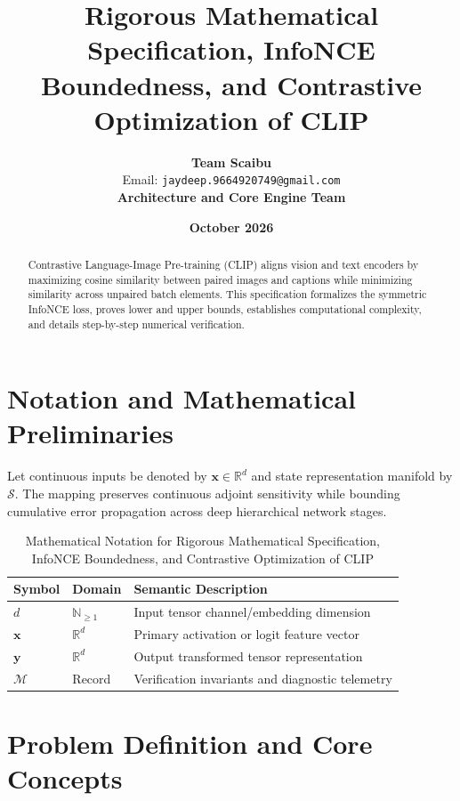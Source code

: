 \documentclass[11pt,a4paper]{article}
\title{\textbf{Rigorous Mathematical Specification, InfoNCE Boundedness, and Contrastive Optimization of CLIP}}
\author{\textbf{Team Scaibu} \\ \small Email: \texttt{jaydeep.9664920749@gmail.com} \\ \small \textbf{Architecture and Core Engine Team}}
\date{\textbf{October 2026}}
\theoremstyle{definition}
\begin{document}
\maketitle

\begin{abstract}
Contrastive Language-Image Pre-training (CLIP) aligns vision and text encoders by maximizing cosine similarity between paired images and captions while minimizing similarity across unpaired batch elements. This specification formalizes the symmetric InfoNCE loss, proves lower and upper bounds, establishes computational complexity, and details step-by-step numerical verification.
\end{abstract}

\section{Notation and Mathematical Preliminaries}

Let continuous inputs be denoted by $\mathbf{x} \in \mathbb{R}^d$ and state representation manifold by $\mathcal{S}$. The mapping preserves continuous adjoint sensitivity while bounding cumulative error propagation across deep hierarchical network stages.

\begin{table}[h]
\centering
\caption{Mathematical Notation for Rigorous Mathematical Specification, InfoNCE Boundedness, and Contrastive Optimization of CLIP}
\begin{tabular}{lll}
\toprule
\textbf{Symbol} & \textbf{Domain} & \textbf{Semantic Description} \\
\midrule
$d$ & $\mathbb{N}_{\ge 1}$ & Input tensor channel/embedding dimension \\
$\mathbf{x}$ & $\mathbb{R}^d$ & Primary activation or logit feature vector \\
$\mathbf{y}$ & $\mathbb{R}^d$ & Output transformed tensor representation \\
$\mathcal{M}$ & Record & Verification invariants and diagnostic telemetry \\
\bottomrule
\end{tabular}
\end{table}

\section{Problem Definition and Core Concepts}
\end{document}
